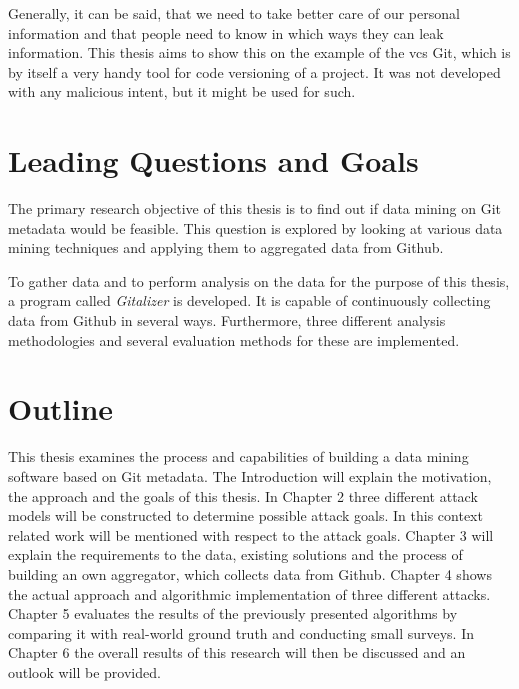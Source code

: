 Generally, it can be said, that we need to take better care of our personal information and that people need to know in which ways they can leak information.
This thesis aims to show this on the example of the \ac{vcs} Git, which is by itself a very handy tool for code versioning of a project.
It was not developed with any malicious intent, but it might be used for such.

\section{Leading Questions and Goals}

The primary research objective of this thesis is to find out if data mining on Git metadata would be feasible.
This question is explored by looking at various data mining techniques and applying them to aggregated data from Github.

To gather data and to perform analysis on the data for the purpose of this thesis, a program called \emph{Gitalizer} is developed.
It is capable of continuously collecting data from Github in several ways.
Furthermore, three different analysis methodologies and several evaluation methods for these are implemented.

\section{Outline}
This thesis examines the process and capabilities of building a data mining software based on Git metadata.
The Introduction will explain the motivation, the approach and the goals of this thesis.
In Chapter 2 three different attack models will be constructed to determine possible attack goals.
In this context related work will be mentioned with respect to the attack goals.
Chapter 3 will explain the requirements to the data, existing solutions and the process of building an own aggregator, which collects data from Github.
Chapter 4 shows the actual approach and algorithmic implementation of three different attacks.
Chapter 5 evaluates the results of the previously presented algorithms by comparing it with real-world ground truth and conducting small surveys.
In Chapter 6 the overall results of this research will then be discussed and an outlook will be provided.
